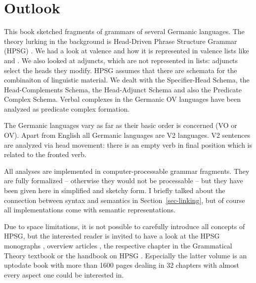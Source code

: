 
\chapter{Outlook}
\label{chap-outlook}

This book sketched fragments of grammars of several Germanic languages. The theory lurking in the
background is Head-Driven Phrase Structure Grammar (HPSG)
\parencites{ps}{ps2}{MuellerLehrbuch3}{HPSGHandbook}. We had a look at valence and how it is
represented in valence lists like \spr and \comps. We also looked at adjuncts, which are not
represented in lists: adjuncts select the heads they modify. HPSG assumes that there are schemata
for the combinaiton of linguistic material. We dealt with the Specifier-Head Schema, the
Head-Complements Schema, the Head-Adjunct Schema and also the Predicate Complex Schema. Verbal
complexes in the Germanic OV languages have been analyzed as predicate complex formation.

The Germanic languages vary as far as their basic order is concerned (VO or OV). Apart from English
all Germanic languages are V2 languages. V2 sentences are analyzed via head movement: there is an
empty verb in final position which is related to the fronted verb.

All analyses are implemented in computer-processable grammar fragments. They are fully formalized –
otherwise they would not be processable – but they have been given here in simplified and sketchy
form. I briefly talked about the connection between syntax and semantics in Section~\ref{sec-linking}, but of
course all implementations come with semantic representations.

Due to space limitations, it is not possible to carefully introduce all concepts of HPSG, but the
interested reader is invited to have a look at the HPSG monographs
\parencites{ps}{ps2}{GSag2000a-u}{MuellerLehrbuch3}, overview articles
\parencites{LM2006a}{PK2006a-u}{Bildhauer2014a-u}{MuellerHPSGHandbook,MuellerCurrentApproaches}, the respective chapter in
the Grammatical Theory textbook \citep[Chapter~9]{MuellerGT-Eng4} or the handbook on HPSG
\citep{HPSGHandbook}. Especially the latter volume is an uptodate book with more than 1600 pages
dealing in 32 chapters with almost every aspect one could be interested in.







